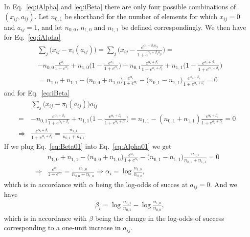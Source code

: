 \documentclass[12pt]{article}
\begin{document}
In Eq.~\ref{eq:iAlpha} and \ref{eq:iBeta} there are only four possible combinations of $(x_{ij},a_{ij})$. Let $n_{0,1}$ be shorthand for the number of elements for which $x_{ij} = 0$ and $a_{ij} = 1$, and let $n_{0,0}$, $n_{1,0}$ and $n_{1,1}$ be defined correspondingly.
We then have for Eq.~\ref{eq:iAlpha}
\begin{align} \label{eq:Alpha01}
 &  \sum_{j} \big (x_{ij} -\pi_i(a_{ij}) \big ) = \sum_{j} \big (x_{ij} -  \frac{e^{\alpha_{i} + \beta_{i} a_{ij}}}{1 + e^{\alpha_{i} + \beta_{i} a_{ji}}} \big ) = \nonumber \\
& - n_{0,0} \frac{e^{\alpha_{i}}}{1 + e^{\alpha_{i}}} + n_{1,0} \big (1 -  \frac{e^{\alpha_{i}}}{1 + e^{\alpha_{i}}} \big ) - n_{0,1}\frac{e^{\alpha_{i} + \beta_{i}}}{1 + e^{\alpha_{i} + \beta_{i}}} + n_{1,1}\big  (1 - \frac{e^{\alpha_{i} + \beta_{i}}}{1 + e^{\alpha_{i} + \beta_{i}}}\big ) \nonumber \\
& = n_{1,0} + n_{1,1} - \big ( n_{0,0} + n_{1,0} \big ) \frac{e^{\alpha_{i}}}{1 + e^{\alpha_{i}}} - \big ( n_{0,1} - n_{1,1} \big ) \frac{e^{\alpha_{i} + \beta_{i}}}{1 + e^{\alpha_{i} + \beta_{i}}} = 0  
\end{align}
and for  Eq.~\ref{eq:iBeta}
\begin{align}  \label{eq:Beta01}
 & \sum_{j}\big  (x_{ij} - \pi_i(a_{ij}) \big )a_{ij} \nonumber \\
= & -  n_{0,1} \frac{e^{\alpha_{i} + \beta_{i}}}{1 + e^{\alpha_{i} + \beta_{i}}} + n_{1,1} \big (1 -  \frac{e^{\alpha_{i} + \beta_{i}}}{1 + e^{\alpha_{i} + \beta_{i}}} \big ) 
 =  n_{1,1} - (n_{0,1} + n_{1,1}) \frac{e^{\alpha_{i} + \beta_{i}}}{1 + e^{\alpha_{i} + \beta_{i}}} = 0 \nonumber \\
\Rightarrow & \frac{e^{\alpha_{i} + \beta_{i}}}{1 + e^{\alpha_{i} + \beta_{i}}} = \frac{n_{1,1}}{n_{0,1} + n_{1,1}}
\end{align}
If we plug Eq.~\ref{eq:Beta01} into Eq.~\ref{eq:Alpha01} we get
\begin{align} \label{eq:AnalyticalAlpha}
&   n_{1,0} + n_{1,1} - \big ( n_{0,0} + n_{1,0} \big ) \frac{e^{\alpha_{i}}}{1 + e^{\alpha_{i}}} - \big ( n_{0,1} - n_{1,1} \big ) \frac{n_{1,1}}{n_{0,1} + n_{1,1}} = 0 \nonumber\\
\Rightarrow & \frac{e^{\alpha_{i}}}{1 + e^{\alpha_{i}}} = \frac{n_{1,0}}{n_{0,0} + n_{1,0}} \Rightarrow \alpha_i = \log \frac{n_{1,0}}{n_{0,0}},
\end{align}
which is in accordance with $\alpha$ being the log-odds of succes at $a_{ij} = 0$.
And we have 
\begin{align} \label{eq:AnalyticalBeta}
&  \beta_i =  \log \frac{n_{1,1}}{n_{0,1}} - \log \frac{n_{1,0}}{n_{0,0}},
\end{align} 
which is in accordance with $\beta$ being the change in the log-odds of success corresponding to a one-unit increase in $a_{ij}$.


\end{document}
